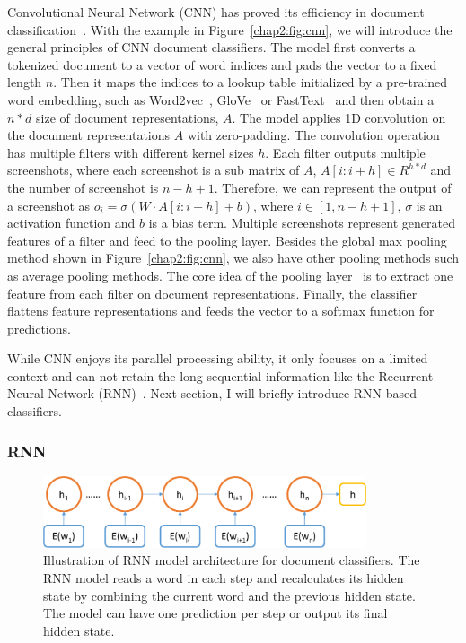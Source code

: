 Convolutional Neural Network (CNN) has proved its efficiency in document classification~\cite{kim2014convolutional}. 
With the example in Figure~\ref{chap2:fig:cnn}, we will introduce the general principles of CNN document classifiers.
The model first converts a tokenized document to a vector of word indices and pads the vector to a fixed length $n$. 
Then it maps the indices to a lookup table initialized by a pre-trained word embedding, such as Word2vec~\cite{mikolov2013distributed}, GloVe~\cite{pennington2014glove} or FastText~\cite{bojanowski2017enriching} and then obtain a $n*d$ size of document representations, $A$.
The model applies 1D convolution on the document representations $A$ with zero-padding.
The convolution operation has multiple filters with different kernel sizes $h$.
Each filter outputs multiple screenshots, where each screenshot is a sub matrix of $A$, $A[i: i+h] \in R^{h*d}$ and the number of screenshot is $n-h+1$.
Therefore, we can represent the output of a screenshot as $o_i = \sigma(W \cdot A[i:i+h] + b)$, where $i \in [1, n-h+1]$, $\sigma$ is an activation function and $b$ is a bias term.
Multiple screenshots represent generated features of a filter and feed to the pooling layer.
Besides the global max pooling method shown in Figure~\ref{chap2:fig:cnn}, we also have other pooling methods such as average pooling methods.
The core idea of the pooling layer~\cite{kim2014convolutional} is to extract one feature from each filter on document representations. 
Finally, the classifier flattens feature representations and feeds the vector to a softmax function for predictions.

While CNN enjoys its parallel processing ability, it only focuses on a limited context and can not retain the long sequential information like the Recurrent Neural Network (RNN)~\cite{goodfellow2016deep}. Next section, I will briefly introduce RNN based classifiers.


\subsubsection{RNN}

\begin{figure}[htp]
\centering
\includegraphics[width=0.85\textwidth]{images/chapter2/rnn.pdf}
\caption{Illustration of RNN model architecture for document classifiers. The RNN model reads a word in each step and recalculates its hidden state by combining the current word and the previous hidden state. The model can have one prediction per step or output its final hidden state.}
\label{chap2:fig:rnn}
\end{figure}

